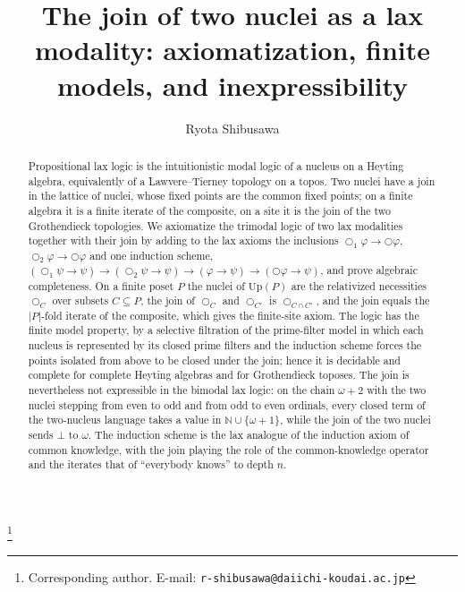 \documentclass[11pt]{amsart}
\theoremstyle{definition}
\newcommand{\Up}{\mathrm{Up}}
\newcommand{\lax}{\bigcirc}
\newcommand{\laxa}{\bigcirc_1}
\newcommand{\laxb}{\bigcirc_2}
\begin{document}
\title[The lax logic of the join of two nuclei]{The join of two nuclei as a lax modality: axiomatization, finite models, and inexpressibility}
\author{Ryota Shibusawa}
\thanks{Corresponding author. E-mail: \texttt{r-shibusawa@daiichi-koudai.ac.jp}}
\address{Daiichi Institute of Technology}

\begin{abstract}
Propositional lax logic is the intuitionistic modal logic of a nucleus on a
Heyting algebra, equivalently of a Lawvere--Tierney topology on a topos. Two
nuclei have a join in the lattice of nuclei, whose fixed points are the common
fixed points; on a finite algebra it is a finite iterate of the composite, on a
site it is the join of the two Grothendieck topologies. We axiomatize the
trimodal logic of two lax modalities together with their join by adding to the
lax axioms the inclusions $\laxa\varphi\to\lax\varphi$, $\laxb\varphi\to\lax\varphi$
and one induction scheme,
$(\laxa\psi\to\psi)\to(\laxb\psi\to\psi)\to(\varphi\to\psi)\to(\lax\varphi\to\psi)$,
and prove algebraic completeness. On a finite poset $P$ the nuclei of $\Up(P)$
are the relativized necessities $\lax_C$ over subsets $C\subseteq P$, the join
of $\lax_C$ and $\lax_{C'}$ is $\lax_{C\cap C'}$, and the join equals the
$|P|$-fold iterate of the composite, which gives the finite-site axiom. The
logic has the finite model property, by a selective filtration of the
prime-filter model in which each nucleus is represented by its closed prime
filters and the induction scheme forces the points isolated from above to be
closed under the join; hence it is decidable and complete for complete Heyting
algebras and for Grothendieck toposes. The
join is nevertheless not expressible in the bimodal lax logic: on the chain
$\omega+2$ with the two nuclei stepping from even to odd and from odd to even
ordinals, every closed term of the two-nucleus language takes a value in
$\mathbb N\cup\{\omega+1\}$, while the join of the two nuclei sends $\bot$ to
$\omega$. The induction scheme is the lax analogue of the induction axiom of
common knowledge, with the join playing the role of the common-knowledge
operator and the iterates that of ``everybody knows'' to depth $n$.
\end{abstract}

\maketitle
\end{document}
